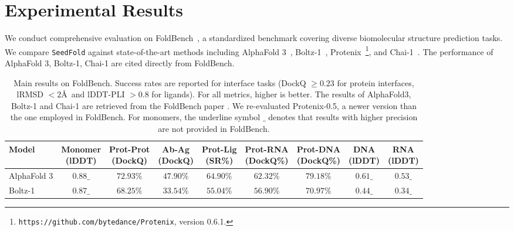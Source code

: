 \section{Experimental Results}
\label{sec:main_results}

We conduct comprehensive evaluation on FoldBench~\cite{xu2025benchmarking}, a standardized benchmark covering diverse biomolecular structure prediction tasks. We compare \texttt{SeedFold} against state-of-the-art methods including AlphaFold 3~\cite{abramson2024accurate}, Boltz-1~\cite{wohlwend2025boltz}, Protenix~\cite{bytedance2025protenix}\footnote{\texttt{https://github.com/bytedance/Protenix}, version 0.6.1.}, and Chai-1~\cite{chai2024chai}. The performance of AlphaFold 3, Boltz-1, Chai-1 are cited directly from FoldBench. 

\begin{table}[t]
    \centering
    \caption{Main results on FoldBench. Success rates are reported for interface tasks (DockQ $\geq 0.23$ for protein interfaces,  lRMSD $< 2$\AA~and lDDT-PLI $> 0.8$ for ligands). For all metrics, higher is better. The results of AlphaFold3, Boltz-1 and Chai-1 are retrieved from the FoldBench paper \cite{xu2025benchmarking}. We re-evaluated Protenix-0.5, a newer version than the one employed in FoldBench. For monomers, the underline symbol $\_$ denotes that results with higher precision are not provided in FoldBench.}
    \label{tab:main_results}
    \begin{tabular}{lcccccccc}
        \toprule
        \textbf{Model} & \makecell{\textbf{Monomer}\\\textbf{(lDDT)}} & \makecell{\textbf{Prot-Prot}\\\textbf{(DockQ)}} & \makecell{\textbf{Ab-Ag}\\\textbf{(DockQ)}} & \makecell{\textbf{Prot-Lig}\\\textbf{(SR\%)}} &
        \makecell{\textbf{Prot-RNA}\\\textbf{(DockQ\%)}} &
        \makecell{\textbf{Prot-DNA}\\\textbf{(DockQ\%)}} &
        \makecell{\textbf{DNA}\\\textbf{(lDDT)}} &
        \makecell{\textbf{RNA}\\\textbf{(lDDT)}}
        \\
        \midrule
        AlphaFold 3 & $0.88\_$ & $72.93\%$ & $47.90\%$ & $64.90\%$ & $62.32\%$ & $\mathbf{79.18\%}$ & $0.61\_$ & $\mathbf{0.53\_}$ \\
        Boltz-1 & $0.87\_$ & $68.25\%$ & $33.54\%$ & $55.04\%$ & $56.90\%$ & $70.97\%$ & $0.44\_$ & $0.34\_$ \\

\end{tabular}
\end{table}
